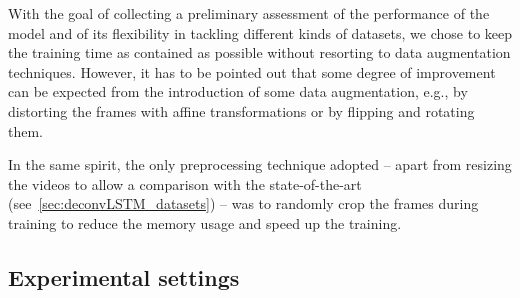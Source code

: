 With the goal of collecting a preliminary assessment of the performance of the
model and of its flexibility in tackling different kinds of datasets, we chose
to keep the training time as contained as possible without resorting to data
augmentation techniques. However, it has to be pointed out that some degree of
improvement can be expected from the introduction of some data augmentation,
e.g., by distorting the frames with affine transformations or by flipping and
rotating them.

In the same spirit, the only preprocessing technique adopted -- apart from
resizing the videos to allow a comparison with the state-of-the-art
(see~\autoref{sec:deconvLSTM_datasets}) -- was to randomly crop the frames
during training to reduce the memory usage and speed up the training.

\subsection{Experimental settings}\label{sec:deconvLSTM_settings}

